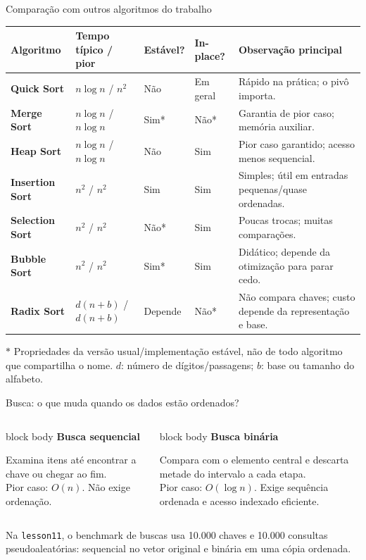 \documentclass[aspectratio=169,11pt]{beamer}
\newcommand{\citep}[1]{{\color{MidGray}\tiny\cite{#1}}}
\newcommand{\softbox}[2]{%
  \begin{beamercolorbox}[wd=\linewidth,sep=.8em,rounded=false]{block body}
    {\bfseries #1}\par\vspace{.25em}#2
  \end{beamercolorbox}
}
\begin{document}
\begin{frame}{Comparação com outros algoritmos do trabalho}
  \scriptsize
  \begin{tabularx}{\textwidth}{>{\bfseries}p{2.05cm} p{2.05cm} p{1.25cm} p{1.35cm} X}
    \toprule
    Algoritmo & Tempo típico / pior & Estável? & In-place? & Observação principal \\
    \midrule
    Quick Sort & \(n\log n\) / \(n^2\) & Não & Em geral & Rápido na prática; o pivô importa. \\
    Merge Sort & \(n\log n\) / \(n\log n\) & Sim* & Não* & Garantia de pior caso; memória auxiliar. \\
    Heap Sort & \(n\log n\) / \(n\log n\) & Não & Sim & Pior caso garantido; acesso menos sequencial. \\
    Insertion Sort & \(n^2\) / \(n^2\) & Sim & Sim & Simples; útil em entradas pequenas/quase ordenadas. \\
    Selection Sort & \(n^2\) / \(n^2\) & Não* & Sim & Poucas trocas; muitas comparações. \\
    Bubble Sort & \(n^2\) / \(n^2\) & Sim* & Sim & Didático; depende da otimização para parar cedo. \\
    Radix Sort & \(d(n+b)\) / \(d(n+b)\) & Depende & Não* & Não compara chaves; custo depende da representação e base. \\
    \bottomrule
  \end{tabularx}
  \vspace{.4em}
  \tiny \(*\) Propriedades da versão usual/implementação estável, não de todo algoritmo que compartilha o nome. \(d\): número de dígitos/passagens; \(b\): base ou tamanho do alfabeto.
  \vfill
  \citep{cormen2022,ziviani2011,knuth1998}
\end{frame}

\begin{frame}{Busca: o que muda quando os dados estão ordenados?}
  \begin{columns}[T,onlytextwidth]
      \softbox{Busca sequencial}{Examina itens até encontrar a chave ou chegar ao fim.\\[.3em]
      Pior caso: \(O(n)\). Não exige ordenação.}
      \softbox{Busca binária}{Compara com o elemento central e descarta metade do intervalo a cada etapa.\\[.3em]
      Pior caso: \(O(\log n)\). Exige sequência ordenada e acesso indexado eficiente.}
  \end{columns}
  \vspace{.65em}
  \begin{center}
    \small
    Na \texttt{lesson11}, o benchmark de buscas usa 10.000 chaves e 10.000 consultas pseudoaleatórias: sequencial no vetor original e binária em uma cópia ordenada.
  \end{center}
  \citep{cormen2022}
\end{frame}
\end{document}
